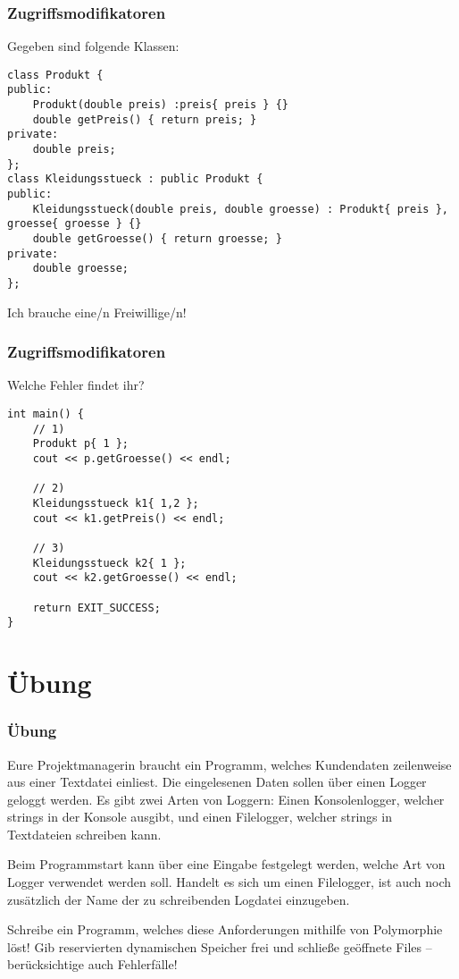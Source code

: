 \documentclass[]{beamer}
\begin{document}
\begin{frame}[fragile]
	\frametitle{Zugriffsmodifikatoren}
	Gegeben sind folgende Klassen:
	\scriptsize
	\begin{lstlisting}
class Produkt {
public:
	Produkt(double preis) :preis{ preis } {}
	double getPreis() { return preis; }
private:
	double preis;
};
class Kleidungsstueck : public Produkt {
public:
	Kleidungsstueck(double preis, double groesse) : Produkt{ preis }, groesse{ groesse } {}
	double getGroesse() { return groesse; }
private:
	double groesse;
};
\end{lstlisting}\normalsize
Ich brauche eine/n Freiwillige/n!
\end{frame}


\begin{frame}[fragile]
	\frametitle{Zugriffsmodifikatoren}
	Welche Fehler findet ihr?
	\footnotesize
	\begin{lstlisting}
int main() {
	// 1)
	Produkt p{ 1 };
	cout << p.getGroesse() << endl;

	// 2)
	Kleidungsstueck k1{ 1,2 };
	cout << k1.getPreis() << endl;
	
	// 3)
	Kleidungsstueck k2{ 1 };
	cout << k2.getGroesse() << endl;
	
	return EXIT_SUCCESS;
}
	\end{lstlisting}
\end{frame}

\section{Übung}

\begin{frame}
	\frametitle{Übung}
	Eure Projektmanagerin braucht ein Programm, welches Kundendaten zeilenweise aus einer Textdatei einliest. Die eingelesenen Daten sollen über einen Logger geloggt werden. Es gibt zwei Arten von Loggern: Einen Konsolenlogger, welcher strings in der Konsole ausgibt, und einen Filelogger, welcher strings in Textdateien schreiben kann.
	
	Beim Programmstart kann über eine Eingabe festgelegt werden, welche Art von Logger verwendet werden soll. Handelt es sich um einen Filelogger, ist auch noch zusätzlich der Name der zu schreibenden Logdatei einzugeben.
	
	Schreibe ein Programm, welches diese Anforderungen mithilfe von Polymorphie löst! Gib reservierten dynamischen Speicher frei und schließe geöffnete Files -- berücksichtige auch Fehlerfälle!
\end{frame}
\end{document}
